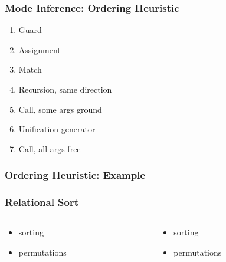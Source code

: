 \documentclass[xcolor={dvipsnames}, aspectratio=169]{beamer}
\newcommand{\happyCheck}{\color{green}{\checkmark}}
\newcommand{\timeout}{\color{red}{\clock}}
\begin{document}
\begin{frame}[fragile]
  \frametitle{Mode Inference: Ordering Heuristic}

\begin{center}
  \begin{minipage}{0.4\textwidth}
    \begin{enumerate}
      \item Guard
      \item Assignment
      \item Match
      \item Recursion, same direction
      \item Call, some args ground
      \item Unification-generator
      \item Call, all args free
    \end{enumerate}
  \end{minipage}
\end{center}


\end{frame}

\begin{frame}[fragile]
  \frametitle{Ordering Heuristic: Example}

\end{frame}


\begin{frame}[fragile]
  \frametitle{Relational Sort}
\begin{columns}
  \begin{column}[t]{0.49\textwidth}
    

    \vfill

    \begin{center}
      \begin{minipage}{0.4\textwidth}
        \begin{itemize}
          \item[\happyCheck] sorting
          \item[\timeout] permutations
        \end{itemize}
      \end{minipage}
    \end{center}

  \end{column}
  \begin{column}[t]{0.49\textwidth}
     

    \vfill

    \begin{center}
      \begin{minipage}{0.4\textwidth}
        \begin{itemize}
          \item[\timeout] sorting
          \item[\happyCheck] permutations
        \end{itemize}
      \end{minipage}
    \end{center}


  \end{column}
\end{columns}
\end{frame}
\end{document}
